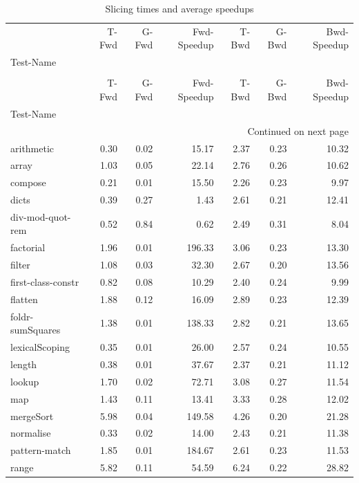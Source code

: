 \begin{longtable}{lrrrrrr}
\caption{Slicing times and average speedups} \label{table:slicing-speedups} \\
\toprule
 & T-Fwd & G-Fwd & Fwd-Speedup & T-Bwd & G-Bwd & Bwd-Speedup \\
Test-Name &  &  &  &  &  &  \\
\midrule
\endfirsthead
\caption[]{Slicing times and average speedups} \\
\toprule
 & T-Fwd & G-Fwd & Fwd-Speedup & T-Bwd & G-Bwd & Bwd-Speedup \\
Test-Name &  &  &  &  &  &  \\
\midrule
\endhead
\midrule
\multicolumn{7}{r}{Continued on next page} \\
\midrule
\endfoot
\bottomrule
\endlastfoot
arithmetic & 0.30 & 0.02 & 15.17 & 2.37 & 0.23 & 10.32 \\
array & 1.03 & 0.05 & 22.14 & 2.76 & 0.26 & 10.62 \\
compose & 0.21 & 0.01 & 15.50 & 2.26 & 0.23 & 9.97 \\
dicts & 0.39 & 0.27 & 1.43 & 2.61 & 0.21 & 12.41 \\
div-mod-quot-rem & 0.52 & 0.84 & 0.62 & 2.49 & 0.31 & 8.04 \\
factorial & 1.96 & 0.01 & 196.33 & 3.06 & 0.23 & 13.30 \\
filter & 1.08 & 0.03 & 32.30 & 2.67 & 0.20 & 13.56 \\
first-class-constr & 0.82 & 0.08 & 10.29 & 2.40 & 0.24 & 9.99 \\
flatten & 1.88 & 0.12 & 16.09 & 2.89 & 0.23 & 12.39 \\
foldr-sumSquares & 1.38 & 0.01 & 138.33 & 2.82 & 0.21 & 13.65 \\
lexicalScoping & 0.35 & 0.01 & 26.00 & 2.57 & 0.24 & 10.55 \\
length & 0.38 & 0.01 & 37.67 & 2.37 & 0.21 & 11.12 \\
lookup & 1.70 & 0.02 & 72.71 & 3.08 & 0.27 & 11.54 \\
map & 1.43 & 0.11 & 13.41 & 3.33 & 0.28 & 12.02 \\
mergeSort & 5.98 & 0.04 & 149.58 & 4.26 & 0.20 & 21.28 \\
normalise & 0.33 & 0.02 & 14.00 & 2.43 & 0.21 & 11.38 \\
pattern-match & 1.85 & 0.01 & 184.67 & 2.61 & 0.23 & 11.53 \\
range & 5.82 & 0.11 & 54.59 & 6.24 & 0.22 & 28.82 \\

\end{longtable}
